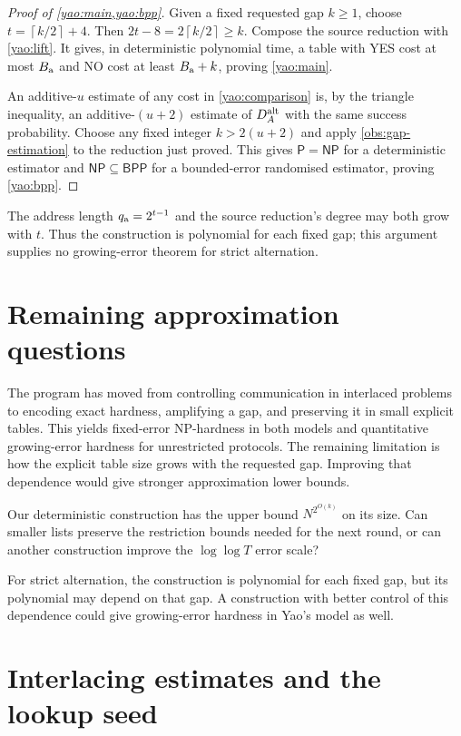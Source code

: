\documentclass[11pt]{article} \usepackage[utf8]{inputenc}
\theoremstyle{plain} \newtheorem{theorem}{Theorem}[section]
\theoremstyle{definition} \newaliascnt{definition}{theorem}
\newcommand{\ceil}[1]{\left\lceil#1\right\rceil}
\newcommand{\NP}{\mathsf{NP}}
\newcommand{\BPP}{\mathsf{BPP}}
\begin{document}
\begin{proof}[Proof of \cref{yao:main,yao:bpp}]
Given a fixed requested gap $k\ge1$, choose $t=\ceil{k/2}+4$. Then
$2t-8=2\ceil{k/2}\ge k$.
Compose the source reduction with \cref{yao:lift}. It gives, in deterministic
polynomial time, a table with YES cost at most $B_{\rm a}$ and NO cost at least
$B_{\rm a}+k$, proving \cref{yao:main}.

An additive-$u$ estimate of any cost in \cref{yao:comparison} is, by the
triangle inequality, an additive-$(u+2)$ estimate of $D_A^{\rm alt}$ with the
same success probability. Choose any fixed integer $k>2(u+2)$ and apply
\cref{obs:gap-estimation} to the reduction just proved. This gives
$\mathsf P=\NP$ for a deterministic estimator and $\NP\subseteq\BPP$ for a
bounded-error randomised estimator, proving \cref{yao:bpp}.
\end{proof}

The address length $q_{\rm a}=2^{t-1}$ and the source reduction's degree may
both grow with $t$. Thus the construction is polynomial for each fixed gap;
this argument supplies no growing-error theorem for strict alternation.

\section{Remaining approximation questions}
\label{sec:conclusion}

The program has moved from controlling communication in interlaced
problems to encoding exact hardness, amplifying a gap, and preserving it
in small explicit tables. This yields fixed-error NP-hardness in both
models and quantitative growing-error hardness for unrestricted protocols.
The remaining limitation is how the explicit table size grows with the
requested gap. Improving that dependence would give stronger approximation lower bounds.

Our deterministic construction has the upper bound $N^{2^{O(k)}}$ on its
size. Can smaller lists preserve the restriction bounds needed for the
next round, or can another construction improve the $\log\log T$ error scale?

For strict alternation, the construction is polynomial for each fixed
gap, but its polynomial may depend on that gap. A construction with
better control of this dependence could give growing-error hardness
in Yao's model as well.

\appendix
\section{Interlacing estimates and the lookup seed}\label{sec:interlacing-details}
\label{sec:interlacing_details}
\end{document}
